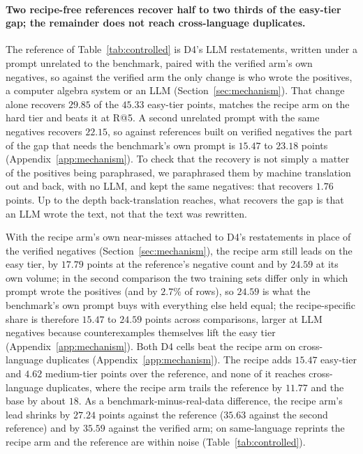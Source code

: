 \paragraph{Two recipe-free references recover half to two thirds of the easy-tier gap; the remainder does not reach cross-language duplicates.}
The reference of Table~\ref{tab:controlled} is D4's LLM restatements, written under a prompt unrelated to the benchmark, paired with the verified arm's own negatives, so against the verified arm the only change is who wrote the positives, a computer algebra system or an LLM (Section~\ref{sec:mechanism}). That change alone recovers $29.85$ of the $45.33$ easy-tier points, matches the recipe arm on the hard tier and beats it at R@5. A second unrelated prompt with the same negatives recovers $22.15$, so against references built on verified negatives the part of the gap that needs the benchmark's own prompt is $15.47$ to $23.18$ points (Appendix~\ref{app:mechanism}). To check that the recovery is not simply a matter of the positives being paraphrased, we paraphrased them by machine translation out and back, with no LLM, and kept the same negatives: that recovers $1.76$ points. Up to the depth back-translation reaches, what recovers the gap is that an LLM wrote the text, not that the text was rewritten.

With the recipe arm's own near-misses attached to D4's restatements in place of the verified negatives (Section~\ref{sec:mechanism}), the recipe arm still leads on the easy tier, by $17.79$ points at the reference's negative count and by $24.59$ at its own volume; in the second comparison the two training sets differ only in which prompt wrote the positives (and by $2.7\%$ of rows), so $24.59$ is what the benchmark's own prompt buys with everything else held equal; the recipe-specific share is therefore $15.47$ to $24.59$ points across comparisons, larger at LLM negatives because counterexamples themselves lift the easy tier (Appendix~\ref{app:mechanism}). Both D4 cells beat the recipe arm on cross-language duplicates (Appendix~\ref{app:mechanism}). The recipe adds $15.47$ easy-tier and $4.62$ medium-tier points over the reference, and none of it reaches cross-language duplicates, where the recipe arm trails the reference by $11.77$ and the base by about $18$. As a benchmark-minus-real-data difference, the recipe arm's lead shrinks by $27.24$ points against the reference ($35.63$ against the second reference) and by $35.59$ against the verified arm; on same-language reprints the recipe arm and the reference are within noise (Table~\ref{tab:controlled}).

